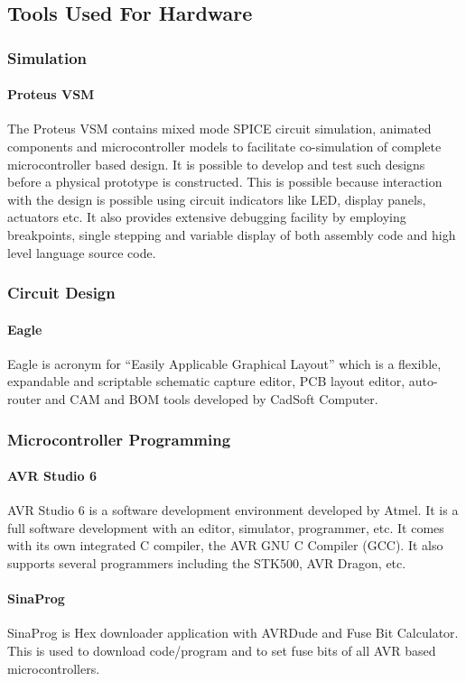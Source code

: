 \documentclass[12pt, a4paper]{article}
\begin{document}
\subsection{Tools Used For Hardware}
\subsubsection{Simulation}
\paragraph {Proteus VSM}
The Proteus VSM contains mixed mode SPICE circuit simulation, animated components and microcontroller models to facilitate co-simulation of complete microcontroller based design. It is possible to develop and test such designs before a physical prototype is constructed. This is possible because interaction with the design is possible using circuit indicators like LED, display panels, actuators etc. It also provides extensive debugging facility by employing breakpoints, single stepping and variable display of both assembly code and high level language source code.

\subsubsection{Circuit Design}
\paragraph{Eagle}
Eagle is acronym for “Easily Applicable Graphical Layout” which is a flexible, expandable and scriptable schematic capture editor, PCB layout editor, auto-router and CAM and BOM tools developed by CadSoft Computer. 

\subsubsection{Microcontroller Programming}
\paragraph {AVR Studio 6}
AVR Studio 6 is a software development environment developed by Atmel. It is a full software development with an editor, simulator, programmer, etc. It comes with its own integrated C compiler, the AVR GNU C Compiler (GCC). It also supports several programmers including the STK500, AVR Dragon, etc. 

\paragraph{SinaProg}
SinaProg is Hex downloader application with AVRDude and Fuse Bit Calculator. This is used to download code/program and to set fuse bits of all AVR based microcontrollers. 
\end{document}
